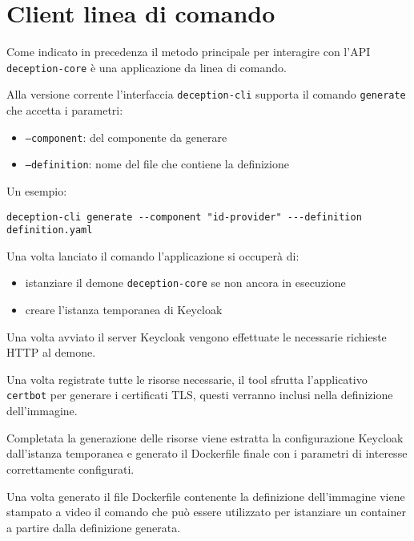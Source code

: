 \section{Client linea di comando}

Come indicato in precedenza il metodo principale per interagire con l'API \texttt{deception-core} è una applicazione da linea di comando.

Alla versione corrente l'interfaccia \texttt{deception-cli} supporta il comando \texttt{generate} che accetta i parametri:
\begin{itemize}
    \item \texttt{--component}: del componente da generare
    \item \texttt{--definition}: nome del file che contiene la definizione
\end{itemize}

Un esempio:

\begin{verbatim}
deception-cli generate --component "id-provider" ---definition definition.yaml
\end{verbatim}

Una volta lanciato il comando l'applicazione si occuperà di:
\begin{itemize}
    \item istanziare il demone \texttt{deception-core} se non ancora in esecuzione
    \item creare l'istanza temporanea di Keycloak
\end{itemize}

Una volta avviato il server Keycloak vengono effettuate le necessarie richieste HTTP al demone.

Una volta registrate tutte le risorse necessarie, il tool sfrutta l'applicativo \texttt{certbot} per generare i certificati TLS, questi verranno inclusi nella definizione dell'immagine.

Completata la generazione delle risorse viene estratta la configurazione Keycloak dall'istanza temporanea e generato il Dockerfile finale con i parametri di interesse correttamente configurati.

Una volta generato il file Dockerfile contenente la definizione dell'immagine viene stampato a video il comando che può essere utilizzato per istanziare un container a partire dalla definizione generata.
